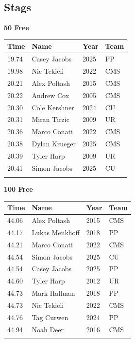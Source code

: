 \subsection{Stags}
\vspace{1.2em}
\noindent\begin{minipage}[t]{0.98\textwidth}
\centering
\textbf{\textcolor{teamprimary}{50 Free}}\par
\vspace{0.5em}
\centering
\small
\renewcommand{\arraystretch}{1.0}
\setlength{\tabcolsep}{4pt}
\begin{tabular}{@{}p{2.5cm}p{4.5cm}p{1.5cm}p{2.5cm}@{}}
\toprule
\textbf{Time} & \textbf{Name} & \textbf{Year} & \textbf{Team} \\
\midrule
19.74 & Casey Jacobs & 2025 & PP \\
19.98 & Nic Tekieli & 2022 & CMS \\
20.21 & Alex Poltash & 2015 & CMS \\
20.22 & Andrew Cox & 2005 & CMS \\
20.30 & Cole Kershner & 2024 & CU \\
20.31 & Miran Tirzic & 2009 & UR \\
20.36 & Marco Conati & 2022 & CMS \\
20.38 & Dylan Krueger & 2025 & CMS \\
20.39 & Tyler Harp & 2009 & UR \\
20.41 & Simon Jacobs & 2025 & CU \\
\bottomrule
\vspace{0.5em}
\end{tabular}
\end{minipage}
\vspace{1.2em}
\noindent\begin{minipage}[t]{0.98\textwidth}
\centering
\textbf{\textcolor{teamprimary}{100 Free}}\par
\vspace{0.5em}
\centering
\small
\renewcommand{\arraystretch}{1.0}
\setlength{\tabcolsep}{4pt}
\begin{tabular}{@{}p{2.5cm}p{4.5cm}p{1.5cm}p{2.5cm}@{}}
\toprule
\textbf{Time} & \textbf{Name} & \textbf{Year} & \textbf{Team} \\
\midrule
44.06 & Alex Poltash & 2015 & CMS \\
44.17 & Lukas Menkhoff & 2018 & PP \\
44.21 & Marco Conati & 2022 & CMS \\
44.54 & Simon Jacobs & 2025 & CU \\
44.54 & Casey Jacobs & 2025 & PP \\
44.60 & Tyler Harp & 2012 & UR \\
44.73 & Mark Hallman & 2018 & PP \\
44.73 & Nic Tekieli & 2022 & CMS \\
44.76 & Tag Curwen & 2024 & PP \\
44.94 & Noah Deer & 2016 & CMS \\
\bottomrule
\vspace{0.5em}
\end{tabular}
\end{minipage}
